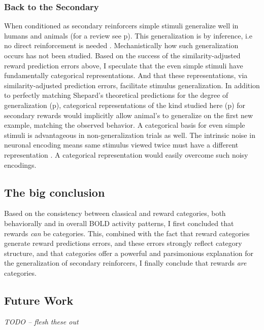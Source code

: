 \documentclass[doc,12pt]{apa}        %
\begin{document}
\subsubsection{Back to the Secondary}
\label{sub:generalsense}
When conditioned as secondary reinforcers simple stimuli generalize well in humans and animals (for a review see p\pageref{subsub:birds}).  This generalization is by inference, i.e no direct reinforcement is needed \cite{Guttman:1956p8355,Nakamura:2006p9093,Smith:2011p9101}.  Mechanistically how such generalization occurs has not been studied.  Based on the success of the similarity-adjusted reward prediction errors above, I speculate that the even simple stimuli have fundamentally categorical representations.  And that these representations, via similarity-adjusted prediction errors, facilitate stimulus generalization.  In addition to perfectly matching Shepard's theoretical predictions for the degree of generalization (p\pageref{subsub:curves}), categorical representations of the kind studied here (p\pageref{subsub:catquant}) for secondary rewards would implicitly allow animal's to generalize on the first new example, matching the observed behavior.  A categorical basis for even simple stimuli is advantageous in non-generalization trials as well. The intrinsic noise in neuronal encoding means same stimulus viewed twice must have a different representation \cite{Ashby:1986p9783}.  A categorical representation would easily overcome such noisy encodings. 

\subsection{The big conclusion}
Based on the consistency between classical and reward categories, both behaviorally and in overall BOLD activity patterns, I first concluded that rewards \emph{can} be categories.  This, combined with the fact that reward categories generate reward predictions errors, and these errors strongly reflect category structure, and that categories offer a powerful and parsimonious explanation for the generalization of secondary reinforcers, I finally conclude that rewards \emph{are} categories.


\subsection{Future Work}
\label{sub:future}

\emph{TODO -- flesh these out}
\end{document}

